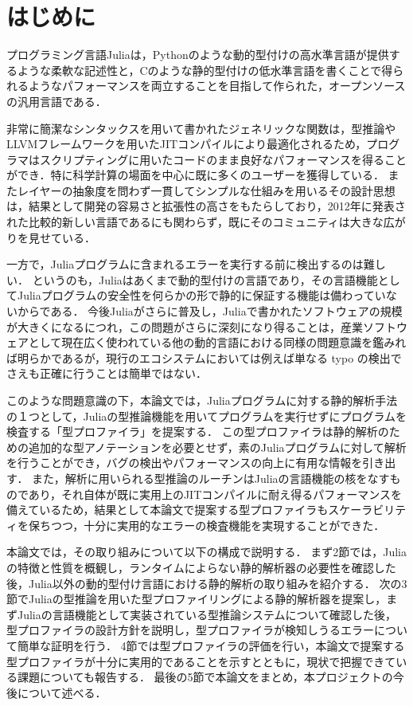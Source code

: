 
\section{はじめに}

プログラミング言語Juliaは，Pythonのような動的型付けの高水準言語が提供するような柔軟な記述性と，Cのような静的型付けの低水準言語を書くことで得られるようなパフォーマンスを両立することを目指して作られた，オープンソースの汎用言語である．

非常に簡潔なシンタックスを用いて書かれたジェネリックな関数は，型推論やLLVMフレームワークを用いたJITコンパイルにより最適化されるため，プログラマはスクリプティングに用いたコードのまま良好なパフォーマンスを得ることができ．特に科学計算の場面を中心に既に多くのユーザーを獲得している．
またレイヤーの抽象度を問わず一貫してシンプルな仕組みを用いるその設計思想は，結果として開発の容易さと拡張性の高さをもたらしており，2012年に発表された比較的新しい言語であるにも関わらず，既にそのコミュニティは大きな広がりを見せている．

一方で，Juliaプログラムに含まれるエラーを実行する前に検出するのは難しい．
というのも，Juliaはあくまで動的型付けの言語であり，その言語機能としてJuliaプログラムの安全性を何らかの形で静的に保証する機能は備わっていないからである．
今後Juliaがさらに普及し，Juliaで書かれたソフトウェアの規模が大きくになるにつれ，この問題がさらに深刻になり得ることは，産業ソフトウェアとして現在広く使われている他の動的言語における同様の問題意識を鑑みれば明らかであるが，現行のエコシステムにおいては例えば単なる typo の検出でさえも正確に行うことは簡単ではない．

このような問題意識の下，本論文では，Juliaプログラムに対する静的解析手法の１つとして，Juliaの型推論機能を用いてプログラムを実行せずにプログラムを検査する「型プロファイラ」を提案する．
この型プロファイラは静的解析のための追加的な型アノテーションを必要とせず，素のJuliaプログラムに対して解析を行うことができ，バグの検出やパフォーマンスの向上に有用な情報を引き出す．
また，解析に用いられる型推論のルーチンはJuliaの言語機能の核をなすものであり，それ自体が既に実用上のJITコンパイルに耐え得るパフォーマンスを備えているため，結果として本論文で提案する型プロファイラもスケーラビリティを保ちつつ，十分に実用的なエラーの検査機能を実現することができた．

本論文では，その取り組みについて以下の構成で説明する．
まず2節では，Juliaの特徴と性質を概観し，ランタイムによらない静的解析器の必要性を確認した後，Julia以外の動的型付け言語における静的解析の取り組みを紹介する．
次の3節でJuliaの型推論を用いた型プロファイリングによる静的解析器を提案し，まずJuliaの言語機能として実装されている型推論システムについて確認した後，型プロファイラの設計方針を説明し，型プロファイラが検知しうるエラーについて簡単な証明を行う．
4節では型プロファイラの評価を行い，本論文で提案する型プロファイラが十分に実用的であることを示すとともに，現状で把握できている課題についても報告する．
最後の5節で本論文をまとめ，本プロジェクトの今後について述べる．
